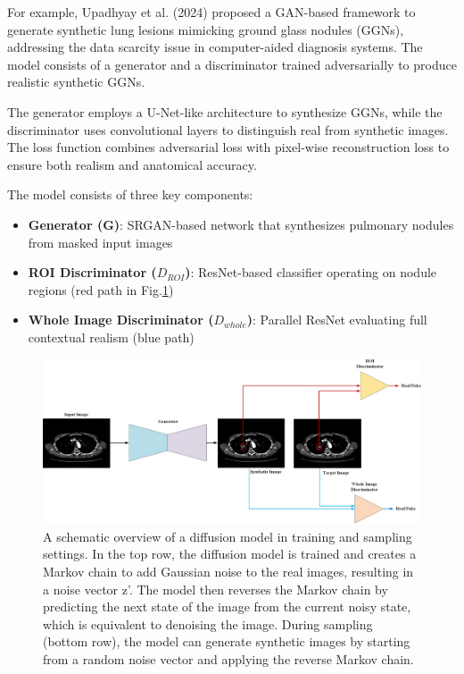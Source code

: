 \documentclass{article}
\begin{document}
For example, Upadhyay et al. (2024)\cite{wangGenerationSyntheticGround2022} proposed a GAN-based framework to generate synthetic lung lesions mimicking ground glass nodules (GGNs), addressing the data scarcity issue in computer-aided diagnosis systems. The model consists of a generator and a discriminator trained adversarially to produce realistic synthetic GGNs.

The generator employs a U-Net-like architecture to synthesize GGNs\cite{8099502}, while the discriminator uses convolutional layers\cite{He2015DeepRL} to distinguish real from synthetic images. The loss function combines adversarial loss with pixel-wise reconstruction loss to ensure both realism and anatomical accuracy.

The model consists of three key components:
\begin{itemize}
\item \textbf{Generator (G)}: SRGAN-based network that synthesizes pulmonary nodules from masked input images
\item \textbf{ROI Discriminator ($D_{ROI}$)}: ResNet-based classifier operating on nodule regions (red path in Fig.\ref{fig:gan_architecture})
\item \textbf{Whole Image Discriminator ($D_{whole}$)}: Parallel ResNet evaluating full contextual realism (blue path)
\end{itemize}

\begin{figure}[htb]
    \centering
    \includegraphics[width=0.98\linewidth]{images/GAN_model.pdf}
    \caption{A schematic overview of a diffusion model in training and sampling settings. In the top row, the diffusion model is trained and creates a Markov chain to add Gaussian noise to the real images, resulting in a noise vector z’. The model then reverses the Markov chain by predicting the next state of the image from the current noisy state, which is equivalent to denoising the image. During sampling (bottom row), the model can generate synthetic images by starting from a random noise vector and applying the reverse Markov chain.}
    \label{fig:gan_architecture}
\end{figure}
\end{document}
